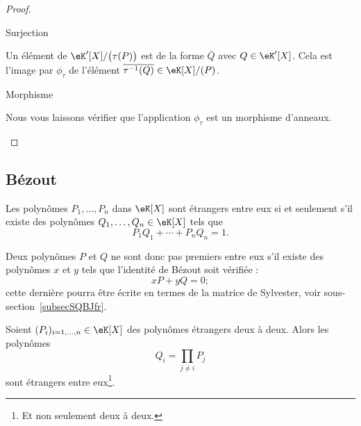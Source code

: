 \begin{proof}
\begin{subproof}
        \item[Surjection]

            Un élément de \( \eK'[X]/\big( \tau(P) \big)\) est de la forme \( \bar Q\) avec \( Q\in \eK'[X]\). Cela est l'image par \( \phi_{\tau}\) de l'élément \( \overline{ \tau^{-1}(Q) }\in \eK[X]/(P)\).

        \item[Morphisme]

            Nous vous laissons vérifier que l'application \( \phi_{\tau}\) est un morphisme d'anneaux.

    \end{subproof}
\end{proof}

\subsection{Bézout}

\begin{theorem}[Bézout] \label{ThoBezoutOuGmLB}
    Les polynômes \( P_1,\ldots,P_n\) dans \( \eK[X]\) sont étrangers entre eux si et seulement s'il existe des polynômes \( Q_1,\ldots,Q_n\in\eK[X]\) tels que
    \begin{equation}
        P_1Q_1+\cdots+P_nQ_n=1.
    \end{equation}
\end{theorem}

Deux polynômes \( P\) et \( Q\) ne sont donc pas premiers entre eux s'il existe des polynômes \( x\) et \( y\) tels que l'identité de Bézout soit vérifiée :
\begin{equation}    \label{EqkbbzAi}
    xP+yQ=0;
\end{equation}
cette dernière pourra être écrite en termes de la matrice de Sylvester, voir sous-section~\ref{subsecSQBJfr}.

\begin{lemma}       \label{LemuALZHn}
    Soient \( (P_i)_{i=1,\ldots,n}\in \eK[X]\) des polynômes étrangers deux à deux. Alors les polynômes \begin{equation} Q_i=\prod_{j\neq i}P_j \end{equation}
    sont étrangers entre eux\footnote{Et non seulement deux à deux.}.
\end{lemma}

